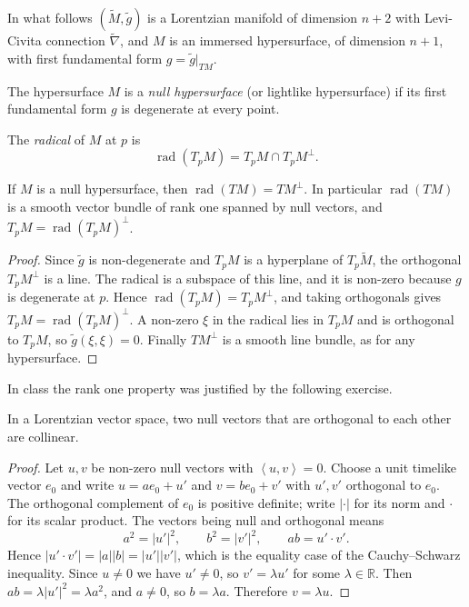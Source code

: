 \noindent
In what follows $(\widetilde{M},
\widetilde{g})$ is a Lorentzian manifold
of dimension $n+2$ with Levi-Civita
connection $\widetilde{\nabla}$, and $M$
is an immersed hypersurface, of dimension
$n+1$, with first fundamental form
$g=\widetilde{g}|_{TM}$.

\begin{definition}
\label{definition-solis-null-hypersurface}
The hypersurface $M$ is a \emph{null
hypersurface} (or lightlike hypersurface)
if its first fundamental form $g$ is
degenerate at every point.
\end{definition}

\noindent
The \emph{radical} of $M$ at $p$ is
$$
\operatorname{rad}(T_pM)
=T_pM\cap T_pM^{\perp}.
$$

\begin{lemma}
\label{lemma-solis-radical-rank-one}
If $M$ is a null hypersurface, then
$\operatorname{rad}(TM)=TM^{\perp}$. In
particular $\operatorname{rad}(TM)$ is a
smooth vector bundle of rank one spanned
by null vectors, and
$T_pM=\operatorname{rad}(T_pM)^{\perp}$.
\end{lemma}

\begin{proof}
Since $\widetilde{g}$ is non-degenerate
and $T_pM$ is a hyperplane of
$T_p\widetilde{M}$, the orthogonal
$T_pM^{\perp}$ is a line. The radical is a
subspace of this line, and it is non-zero
because $g$ is degenerate at $p$. Hence
$\operatorname{rad}(T_pM)=T_pM^{\perp}$,
and taking orthogonals gives
$T_pM=\operatorname{rad}(T_pM)^{\perp}$.
A non-zero $\xi$ in the radical lies in
$T_pM$ and is orthogonal to $T_pM$, so
$\widetilde{g}(\xi,\xi)=0$. Finally
$TM^{\perp}$ is a smooth line bundle, as
for any hypersurface.
\end{proof}

\noindent
In class the rank one property was
justified by the following exercise.

\begin{exercise}
\label{exercise-solis-null-orthogonal}
In a Lorentzian vector space, two null
vectors that are orthogonal to each other
are collinear.
\end{exercise}

\begin{proof}
Let $u,v$ be non-zero null vectors with
$\left\langle{} u,v \right\rangle{}=0$.
Choose a unit timelike vector $e_0$ and
write $u=ae_0+u'$ and $v=be_0+v'$ with
$u',v'$ orthogonal to $e_0$. The
orthogonal complement of $e_0$ is
positive definite; write $|\cdot|$ for its
norm and $\cdot$ for its scalar product.
The vectors being null and orthogonal
means
$$
a^2=|u'|^2,\qquad b^2=|v'|^2,\qquad
ab=u'\cdot v'.
$$
Hence
$|u'\cdot v'|=|a||b|=|u'||v'|$, which is
the equality case of the Cauchy--Schwarz
inequality. Since $u\neq 0$ we have
$u'\neq 0$, so $v'=\lambda u'$ for some
$\lambda\in\mathbb{R}$. Then
$ab=\lambda|u'|^2=\lambda a^2$, and
$a\neq 0$, so $b=\lambda a$. Therefore
$v=\lambda u$.
\end{proof}


